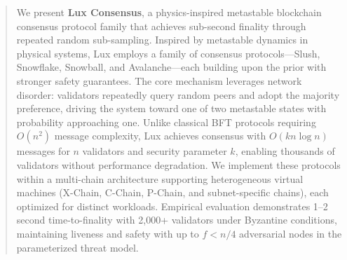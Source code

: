 \begin{abstract}
We present \textbf{Lux Consensus}, a physics-inspired metastable blockchain consensus protocol family that achieves sub-second finality through repeated random sub-sampling. Inspired by metastable dynamics in physical systems, Lux employs a family of consensus protocols---Slush, Snowflake, Snowball, and Avalanche---each building upon the prior with stronger safety guarantees. The core mechanism leverages network disorder: validators repeatedly query random peers and adopt the majority preference, driving the system toward one of two metastable states with probability approaching one. Unlike classical BFT protocols requiring $O(n^2)$ message complexity, Lux achieves consensus with $O(kn \log n)$ messages for $n$ validators and security parameter $k$, enabling thousands of validators without performance degradation. We implement these protocols within a multi-chain architecture supporting heterogeneous virtual machines (X-Chain, C-Chain, P-Chain, and subnet-specific chains), each optimized for distinct workloads. Empirical evaluation demonstrates 1--2 second time-to-finality with 2,000+ validators under Byzantine conditions, maintaining liveness and safety with up to $f < n/4$ adversarial nodes in the parameterized threat model.
\end{abstract}
